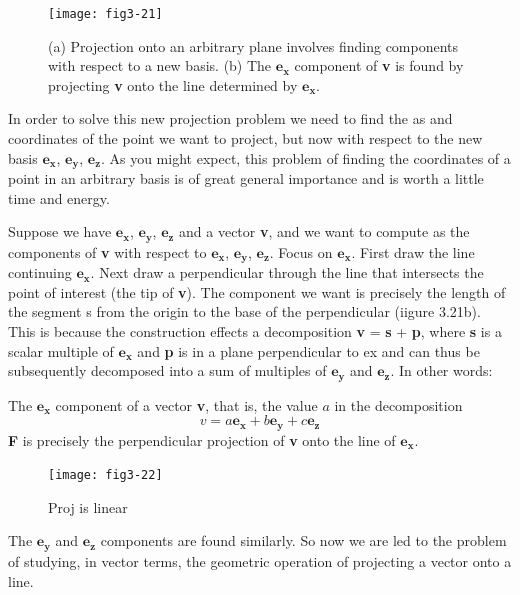 \documentclass{book}
\begin{document}
\begin{figure}
\begin{center}
\texttt{[image: fig3-21]}
\caption{(a) Projection onto an arbitrary plane involves finding components with respect to a new basis. (b) The $\mathbf{e_x}$ component of \textbf{v} is found by projecting \textbf{v} onto the line determined by $\mathbf{e_x}$.}
\end{center}
\end{figure}

In order to solve this new projection problem we need to find the as and
coordinates of the point we want to project, but now with respect to
the new basis $\mathbf{e_x}$, $\mathbf{e_y}$, $\mathbf{e_z}$. As you might expect, this problem of finding the
coordinates of a point in an arbitrary basis is of great general importance
and is worth a little time and energy.

Suppose we have $\mathbf{e_x}$, $\mathbf{e_y}$, $\mathbf{e_z}$ and a vector \textbf{v}, and we want to compute
as the components of \textbf{v} with respect to $\mathbf{e_x}$, $\mathbf{e_y}$, $\mathbf{e_z}$. Focus on $\mathbf{e_x}$. First draw
the line continuing $\mathbf{e_x}$. Next draw a perpendicular through the line that
intersects the point of interest (the tip of \textbf{v}). The component we want is
precisely the length of the segment s from the origin to the base of the
perpendicular (iigure 3.21b). This is because the construction effects a
decomposition \textbf{v} = \textbf{s} + \textbf{p}, where \textbf{s} is a scalar multiple of $\mathbf{e_x}$ and \textbf{p} is in
a plane perpendicular to ex and can thus be subsequently decomposed
into a sum of multiples of $\mathbf{e_y}$ and $\mathbf{e_z}$. In other words:

The $\mathbf{e_x}$ component of a vector \textbf{v}, that is, the value $a$ in the decomposition
$$v = a\mathbf{e_x} + b\mathbf{e_y} + c\mathbf{e_z}$$
 \textbf{F} is precisely the perpendicular projection of \textbf{v} onto the line of $\mathbf{e_x}$.

\begin{figure}
\begin{center}
\texttt{[image: fig3-22]}
\caption{Proj is linear}
\end{center}
\end{figure}

The $\mathbf{e_y}$ and $\mathbf{e_z}$ components are found similarly. So now we are led to
the problem of studying, in vector terms, the geometric operation of
projecting a vector onto a line.
\end{document}
